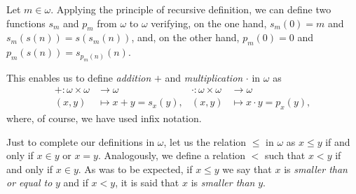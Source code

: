 \begin{definition}
Let $m\in \omega$. Applying the principle of recursive definition, we can define two functions $s_m$ and $p_m$ from $\omega$ to $\omega$ verifying, on the one hand, $s_m(0) = m$ and $s_m(s(n)) = s(s_m(n))$, and, on the other hand, $p_m(0) = 0$ and $p_m(s(n)) = s_{p_m(n)}(n)$.

This enables us to define \emph{addition} $+$ and \emph{multiplication} $\cdot$ in $\omega$ as
\begin{align*}
+:\omega \times \omega & \longrightarrow \omega & \cdot : \omega \times \omega & \longrightarrow \omega \\
(x,y) &\longmapsto x+y = s_x(y), & (x,y) & \longmapsto x\cdot y = p_x(y),
\end{align*}
where, of course, we have used infix notation.

Just to complete our definitions in $\omega$, let us the relation $\leq$ in $\omega$ as $x\leq y$ if and only if $x\in y$ or $x = y$. Analogously, we define a relation $<$ such that $x < y$ if and only if $x \in y$. As was to be expected, if $x\leq y$ we say that $x$ is \emph{smaller than or equal to} $y$ and if $x < y$, it is said that $x$ is \emph{smaller than} $y$. 
\label{<+label+>}
\end{definition}

